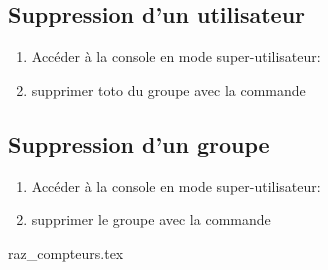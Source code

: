 \subsection{Suppression d'un utilisateur}

\begin{enumerate}
	\item Accéder à la console en mode super-utilisateur: 
	\item supprimer toto du groupe  avec la commande 
	\end{enumerate}
	
\subsection{Suppression d'un groupe}

\begin{enumerate}
	\item Accéder à la console en mode super-utilisateur: 
	\item supprimer le groupe   avec la commande 
	\end{enumerate}
	
{raz_compteurs.tex}
\newpage